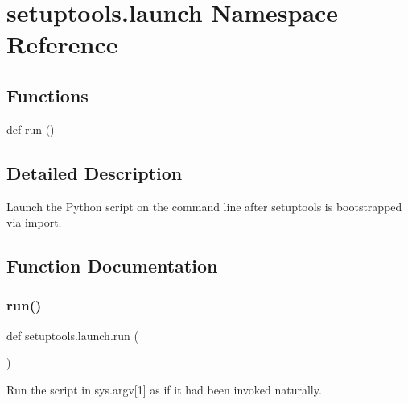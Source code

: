 \hypertarget{namespacesetuptools_1_1launch}{}\section{setuptools.\+launch Namespace Reference}
\label{namespacesetuptools_1_1launch}
\subsection*{Functions}
\begin{DoxyCompactItemize}
\item 
def \hyperlink{namespacesetuptools_1_1launch_af5305aff3ea020e40c0696ae7a071650}{run} ()
\end{DoxyCompactItemize}


\subsection{Detailed Description}
\begin{DoxyVerb}Launch the Python script on the command line after
setuptools is bootstrapped via import.
\end{DoxyVerb}
 

\subsection{Function Documentation}
\mbox{\label{namespacesetuptools_1_1launch_af5305aff3ea020e40c0696ae7a071650}} 
\subsubsection{\texorpdfstring{run()}{run()}}
{\footnotesize\ttfamily def setuptools.\+launch.\+run (\begin{DoxyParamCaption}{ }\end{DoxyParamCaption})}

\begin{DoxyVerb}Run the script in sys.argv[1] as if it had
been invoked naturally.
\end{DoxyVerb}
 